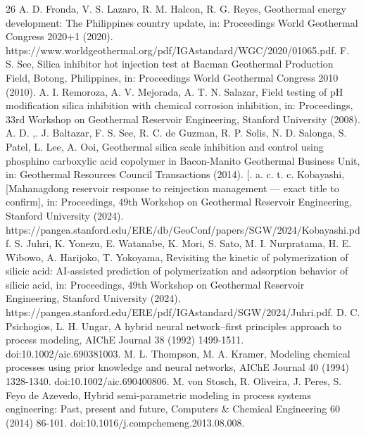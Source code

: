 \documentclass[review,number,sort&compress]{elsarticle}
\begin{document}
\begin{thebibliography}{26}
 A. D. Fronda, V. S. Lazaro, R. M. Halcon, R. G. Reyes, Geothermal energy development: The Philippines country update, in: Proceedings World Geothermal Congress 2020+1 (2020). https://www.worldgeothermal.org/pdf/IGAstandard/WGC/2020/01065.pdf.
 F. S. See, Silica inhibitor hot injection test at Bacman Geothermal Production Field, Botong, Philippines, in: Proceedings World Geothermal Congress 2010 (2010).
 A. I. Remoroza, A. V. Mejorada, A. T. N. Salazar, Field testing of pH modification silica inhibition with chemical corrosion inhibition, in: Proceedings, 33rd Workshop on Geothermal Reservoir Engineering, Stanford University (2008).
 A. D. ,. J. Baltazar, F. S. See, R. C. de Guzman, R. P. Solis, N. D. Salonga, S. Patel, L. Lee, A. Ooi, Geothermal silica scale inhibition and control using phosphino carboxylic acid copolymer in Bacon-Manito Geothermal Business Unit, in: Geothermal Resources Council Transactions (2014).
 [. a. c. t. c. Kobayashi, [Mahanagdong reservoir response to reinjection management — exact title to confirm], in: Proceedings, 49th Workshop on Geothermal Reservoir Engineering, Stanford University (2024). https://pangea.stanford.edu/ERE/db/GeoConf/papers/SGW/2024/Kobayashi.pdf.
 S. Juhri, K. Yonezu, E. Watanabe, K. Mori, S. Sato, M. I. Nurpratama, H. E. Wibowo, A. Harijoko, T. Yokoyama, Revisiting the kinetic of polymerization of silicic acid: AI-assisted prediction of polymerization and adsorption behavior of silicic acid, in: Proceedings, 49th Workshop on Geothermal Reservoir Engineering, Stanford University (2024). https://pangea.stanford.edu/ERE/pdf/IGAstandard/SGW/2024/Juhri.pdf.
 D. C. Psichogios, L. H. Ungar, A hybrid neural network--first principles approach to process modeling, AIChE Journal 38 (1992) 1499-1511. doi:10.1002/aic.690381003.
 M. L. Thompson, M. A. Kramer, Modeling chemical processes using prior knowledge and neural networks, AIChE Journal 40 (1994) 1328-1340. doi:10.1002/aic.690400806.
 M. von Stosch, R. Oliveira, J. Peres, S. Feyo de Azevedo, Hybrid semi-parametric modeling in process systems engineering: Past, present and future, Computers \& Chemical Engineering 60 (2014) 86-101. doi:10.1016/j.compchemeng.2013.08.008.

\end{thebibliography}
\end{document}

